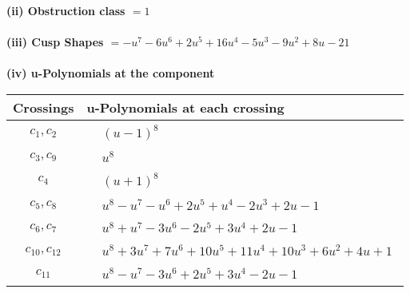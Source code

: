 \documentclass[1p]{elsarticle_modified}
\theoremstyle{definition}
\begin{document}
\flushleft \textbf{(ii) Obstruction class $= 1$}\\~\\
\flushleft \textbf{(iii) Cusp Shapes $= - u^7-6 u^6+2 u^5+16 u^4-5 u^3-9 u^2+8 u-21$}\\~\\
\newpage\renewcommand{\arraystretch}{1}
\flushleft \textbf{(iv) u-Polynomials at the component}\newline \\
\begin{tabular}{m{50pt}|m{274pt}}
Crossings & \hspace{64pt}u-Polynomials at each crossing \\
\hline $$\begin{aligned}c_{1},c_{2}\end{aligned}$$&$\begin{aligned}
&(u-1)^8
\end{aligned}$\\
\hline $$\begin{aligned}c_{3},c_{9}\end{aligned}$$&$\begin{aligned}
&u^8
\end{aligned}$\\
\hline $$\begin{aligned}c_{4}\end{aligned}$$&$\begin{aligned}
&(u+1)^8
\end{aligned}$\\
\hline $$\begin{aligned}c_{5},c_{8}\end{aligned}$$&$\begin{aligned}
&u^8- u^7- u^6+2 u^5+u^4-2 u^3+2 u-1
\end{aligned}$\\
\hline $$\begin{aligned}c_{6},c_{7}\end{aligned}$$&$\begin{aligned}
&u^8+u^7-3 u^6-2 u^5+3 u^4+2 u-1
\end{aligned}$\\
\hline $$\begin{aligned}c_{10},c_{12}\end{aligned}$$&$\begin{aligned}
&u^8+3 u^7+7 u^6+10 u^5+11 u^4+10 u^3+6 u^2+4 u+1
\end{aligned}$\\
\hline $$\begin{aligned}c_{11}\end{aligned}$$&$\begin{aligned}
&u^8- u^7-3 u^6+2 u^5+3 u^4-2 u-1
\end{aligned}$\\
\hline
\end{tabular}\\~\\
\end{document}
